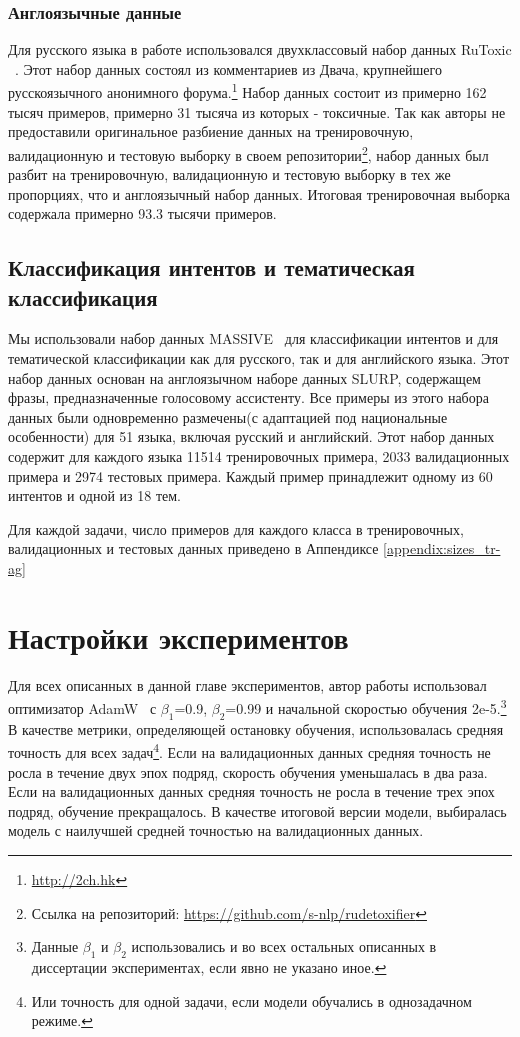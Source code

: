 \subsubsection{Англоязычные данные}
Для русского языка в работе использовался двухклассовый набор данных {RuToxic} ~\cite{ru_toxic}. Этот набор данных состоял из комментариев из Двача, крупнейшего русскоязычного анонимного форума.\footnote{\url{http://2ch.hk}} Набор данных состоит из примерно 162 тысяч примеров, примерно 31 тысяча из которых - токсичные. Так как авторы не предоставили оригинальное разбиение данных на тренировочную, валидационную и тестовую выборку в своем репозитории\footnote{Ссылка на репозиторий: \url{https://github.com/s-nlp/rudetoxifier}}, набор данных был разбит на тренировочную, валидационную и тестовую выборку в тех же пропорциях, что и англоязычный набор данных. Итоговая тренировочная выборка содержала примерно 93.3 тысячи примеров.

\subsection{Классификация интентов и тематическая классификация }
Мы использовали набор данных {MASSIVE}~\cite{massive} для классификации интентов и для тематической классификации как для русского, так и для английского языка. Этот набор данных основан на англоязычном наборе данных SLURP\cite{slurp}, содержащем фразы, предназначенные голосовому ассистенту.
 Все примеры из этого набора данных были одновременно размечены(с адаптацией под национальные особенности) для 51 языка, включая русский и английский. Этот набор данных содержит для каждого языка 11514 тренировочных примера, 2033 валидационных примера и 2974 тестовых примера. Каждый пример принадлежит одному из 60 интентов и одной из 18 тем. 

Для каждой задачи, число примеров для каждого класса в тренировочных, валидационных и тестовых данных приведено в Аппендиксе \ref{appendix:sizes_tr-ag} 

\section {Настройки экспериментов}\label{ch:tr-ag:settings}
Для всех описанных в данной главе экспериментов, автор работы использовал оптимизатор AdamW~\cite{kingma_2014} с  $\beta_1$=0.9, $\beta_2$=0.99 и начальной скоростью обучения 2e-5.\footnote{Данные $\beta_1$ и $\beta_2$ использовались и во всех остальных описанных в диссертации экспериментах, если явно не указано иное.}  В качестве метрики, определяющей остановку обучения, использовалась средняя точность для всех задач\footnote{Или точность для одной задачи, если модели обучались в однозадачном режиме.}. Если на валидационных данных средняя точность не росла в течение двух эпох подряд, скорость обучения уменьшалась в два раза. Если на валидационных данных средняя точность не росла в течение трех эпох подряд, обучение прекращалось. В качестве итоговой версии модели, выбиралась модель с наилучшей средней точностью на валидационных данных.

